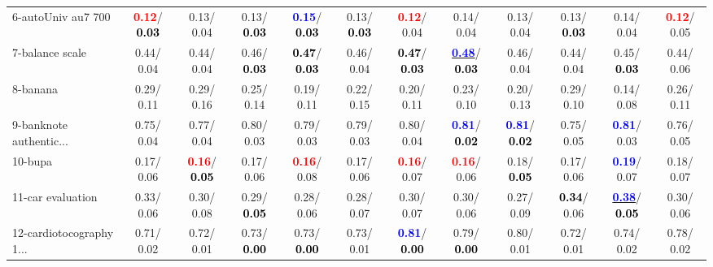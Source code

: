 \begin{table}[h]
\begin{center}
{\begin{tabular}{lc|c|c|c|c|c|c|c|c|c|c}
6-autoUniv au7 700 & \textcolor{red}{\textbf{  0.12}}/\textcolor{black}{\textbf{  0.03}} &   0.13/  0.04 &   0.13/\textcolor{black}{\textbf{  0.03}} & \textcolor{blue}{\textbf{  0.15}}/\textcolor{black}{\textbf{  0.03}} &   0.13/\textcolor{black}{\textbf{  0.03}} & \textcolor{red}{\textbf{  0.12}}/  0.04 &   0.14/  0.04 &   0.13/  0.04 &   0.13/\textcolor{black}{\textbf{  0.03}} &   0.14/  0.04 & \textcolor{red}{\textbf{  0.12}}/  0.05 \\
7-balance scale &   0.44/  0.04 &   0.44/  0.04 &   0.46/\textcolor{black}{\textbf{  0.03}} & \textcolor{black}{\textbf{  0.47}}/\textcolor{black}{\textbf{  0.03}} &   0.46/  0.04 & \textcolor{black}{\textbf{  0.47}}/\textcolor{black}{\textbf{  0.03}} & \underline{\textcolor{blue}{\textbf{  0.48}}}/\textcolor{black}{\textbf{  0.03}} &   0.46/  0.04 &   0.44/  0.04 &   0.45/\textcolor{black}{\textbf{  0.03}} &   0.44/  0.06 \\ \hline
8-banana &   0.29/  0.11 &   0.29/  0.16 &   0.25/  0.14 &   0.19/  0.11 &   0.22/  0.15 &   0.20/  0.11 &   0.23/  0.10 &   0.20/  0.13 &   0.29/  0.10 &   0.14/  0.08 &   0.26/  0.11 \\
9-banknote authentic... &   0.75/  0.04 &   0.77/  0.04 &   0.80/  0.03 &   0.79/  0.03 &   0.79/  0.03 &   0.80/  0.04 & \textcolor{blue}{\textbf{  0.81}}/\textcolor{black}{\textbf{  0.02}} & \textcolor{blue}{\textbf{  0.81}}/\textcolor{black}{\textbf{  0.02}} &   0.75/  0.05 & \textcolor{blue}{\textbf{  0.81}}/  0.03 &   0.76/  0.05 \\
10-bupa &   0.17/  0.06 & \textcolor{red}{\textbf{  0.16}}/\textcolor{black}{\textbf{  0.05}} &   0.17/  0.06 & \textcolor{red}{\textbf{  0.16}}/  0.08 &   0.17/  0.06 & \textcolor{red}{\textbf{  0.16}}/  0.07 & \textcolor{red}{\textbf{  0.16}}/  0.06 &   0.18/\textcolor{black}{\textbf{  0.05}} &   0.17/  0.06 & \textcolor{blue}{\textbf{  0.19}}/  0.07 &   0.18/  0.07 \\
11-car evaluation &   0.33/  0.06 &   0.30/  0.08 &   0.29/\textcolor{black}{\textbf{  0.05}} &   0.28/  0.06 &   0.28/  0.07 &   0.30/  0.07 &   0.30/  0.06 &   0.27/  0.09 & \textcolor{black}{\textbf{  0.34}}/  0.06 & \underline{\textcolor{blue}{\textbf{  0.38}}}/\textcolor{black}{\textbf{  0.05}} &   0.30/  0.06 \\
12-cardiotocography 1... &   0.71/  0.02 &   0.72/  0.01 &   0.73/\textcolor{black}{\textbf{  0.00}} &   0.73/\textcolor{black}{\textbf{  0.00}} &   0.73/  0.01 & \textcolor{blue}{\textbf{  0.81}}/\textcolor{black}{\textbf{  0.00}} &   0.79/\textcolor{black}{\textbf{  0.00}} &   0.80/  0.01 &   0.72/  0.01 &   0.74/  0.02 &   0.78/  0.02 \\

\end{tabular}}
\end{center}
\end{table}
